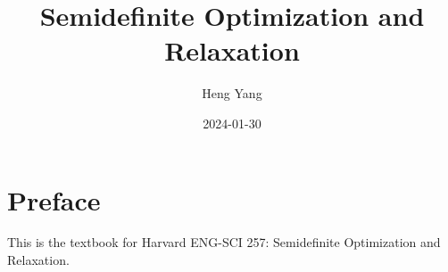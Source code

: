 \documentclass[
]{book}
\title{Semidefinite Optimization and Relaxation}
\author{Heng Yang}
\date{2024-01-30}
\theoremstyle{definition}
\theoremstyle{definition}
\theoremstyle{definition}
\theoremstyle{definition}
\theoremstyle{remark}
\begin{document}
\maketitle

{
\setcounter{tocdepth}{1}
\tableofcontents
}
\newcommand{\calQ}{\mathcal{Q}}
\newcommand{\calA}{\mathcal{A}}
\newcommand{\calK}{\mathcal{K}}
\newcommand{\mathx}{\mathrm{x}}
\newcommand{\mathy}{\mathrm{y}}

\newcommand{\Real}[1]{\mathbb{R}^{#1}}
\newcommand{\sym}[1]{\mathbb{S}^{#1}}
\newcommand{\psd}[1]{\sym{#1}_{+}}
\newcommand{\pd}[1]{\sym{#1}_{++}}
\newcommand{\inprod}[2]{\langle #1, #2 \rangle}
\newcommand{\linprod}[2]{\left\langle #1, #2 \right\rangle}
\newcommand{\trace}{\mathrm{tr}}
\newcommand{\tran}{^\top}

\newcommand{\rank}{\mathrm{rank}}
\newcommand{\diag}{\mathrm{diag}}
\newcommand{\Diag}{\mathrm{Diag}}
\newcommand{\BlkDiag}{\mathrm{BlkDiag}}
\newcommand{\vectorize}{\mathrm{vec}}
\newcommand{\svec}{\mathrm{svec}}
\newcommand{\mat}{\mathrm{mat}}
\newcommand{\smat}{\mathrm{smat}}
\newcommand{\norm}[1]{\Vert #1 \Vert}
\newcommand{\lnorm}[1]{\left\Vert #1 \right\Vert}
\newcommand{\pnorm}[2]{\Vert #1 \Vert_{#2}}
\newcommand{\Fnorm}[1]{\Vert #1 \Vert_\mathrm{F}}
\newcommand{\conv}{\mathrm{conv}}
\newcommand{\cone}{\mathrm{cone}}
\newcommand{\interior}{\mathrm{int}}
\newcommand{\relint}{\mathrm{ri}}
\newcommand{\poly}[1]{\mathbb{R}[#1]}
\newcommand{\SOd}{\mathrm{SO}(d)}
\newcommand{\SOthree}{\mathrm{SO}(3)}
\newcommand{\Od}{\mathrm{O}(d)}
\newcommand{\Ogroup}{\mathrm{O}}
\newcommand{\usphere}{\mathcal{S}}
\newcommand{\bmath}[1]{\boldsymbol{#1}}
\newcommand{\lbrkt}{[\![}
\newcommand{\rbrkt}{]\!]}
\newcommand{\brkt}[1]{\lbrkt #1 \rbrkt}

\newcommand{\cbrace}[1]{\{ #1 \}}
\newcommand{\lcbrace}[1]{ \left\{ #1 \right\} }
\newcommand{\aff}{\mathrm{aff}}
\newcommand{\bbN}{\mathbb{N}}
\newcommand{\dist}{\mathrm{dist}}
\newcommand{\subject}{\mathrm{s.t.}}
\newcommand{\cl}{\mathrm{cl}}
\newcommand{\eye}{\mathrm{I}}
\newcommand{\inv}{^{-1}}
\newcommand{\Range}{\mathrm{Range}}
\renewcommand{\ker}{\mathrm{ker}}
\newcommand{\face}{\mathrm{face}}
\newcommand{\lmid}{\ \middle\vert\ }

\hypertarget{preface}{%
\chapter*{Preface}\label{preface}}

This is the textbook for Harvard ENG-SCI 257: Semidefinite Optimization and Relaxation.
\end{document}
